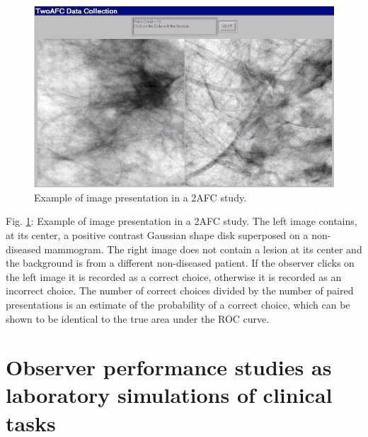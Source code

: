 \documentclass[
]{book}
\begin{document}
\begin{figure}

{\centering \includegraphics[width=10in]{images/2AFC} 

}

\caption{Example of image presentation in a 2AFC study.}\label{fig:2AFC}
\end{figure}

Fig. \ref{fig:2AFC}: Example of image presentation in a 2AFC study. The left image contains, at its center, a positive contrast Gaussian shape disk superposed on a non-diseased mammogram. The right image does not contain a lesion at its center and the background is from a different non-diseased patient. If the observer clicks on the left image it is recorded as a correct choice, otherwise it is recorded as an incorrect choice. The number of correct choices divided by the number of paired presentations is an estimate of the probability of a correct choice, which can be shown to be identical to the true area under the ROC curve.

\hypertarget{binary-task-observer-studies-as-simulations}{%
\section{Observer performance studies as laboratory simulations of clinical tasks}\label{binary-task-observer-studies-as-simulations}}
\end{document}
